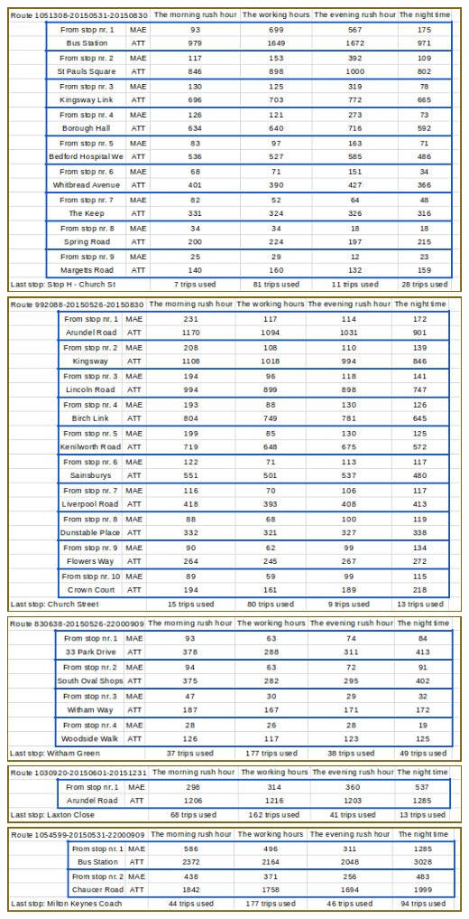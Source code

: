 \documentclass[12pt,a4paper,oneside,openright]{report}
\begin{document}
\includegraphics[width=\textwidth]{figs/table_of_1051308.png}
\includegraphics[width=\textwidth]{figs/table_of_992088.png}
\includegraphics[width=\textwidth]{figs/table_of_830638.png}
\includegraphics[width=\textwidth]{figs/table_of_1030920.png}
\includegraphics[width=\textwidth]{figs/table_of_1054599.png}
\end{document}

